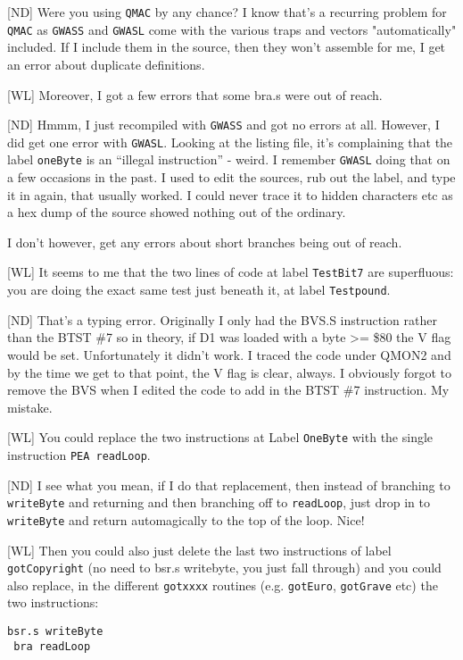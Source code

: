 [ND] Were you using \texttt{QMAC} by any chance? I know that's a recurring problem for \texttt{QMAC} as \texttt{GWASS} and \texttt{GWASL} come with the various traps and vectors "automatically" included. If I include them in the source, then they won't assemble for me, I get an error about duplicate definitions.


[WL] Moreover, I got a few errors that some bra.s  were out of reach.

[ND] Hmmm, I just recompiled with \texttt{GWASS} and got no errors at all. However, I did get one error with \texttt{GWASL}. Looking at the listing file, it's complaining that the label \texttt{oneByte} is an ``illegal instruction'' - weird. I remember \texttt{GWASL} doing that on a few occasions in the past. I used to edit the sources, rub out the label, and type it in again, that usually worked. I could never trace it to hidden characters etc as a hex dump of the source showed nothing out of the ordinary.

I don't however, get any errors about short branches being out of reach. 


[WL] It seems to me that the two lines of code at label \texttt{TestBit7} are superfluous: you are doing the exact same test just beneath it, at label \texttt{Testpound}.

[ND] That's a typing error. Originally I only had the BVS.S instruction rather than the BTST \#7 so in theory, if D1 was loaded with a byte >= \$80 the V flag would be set. Unfortunately it didn't work. I traced the code under QMON2 and by the time we get to that point, the V flag is clear, always. I obviously forgot to remove the BVS when I edited the code to add in the BTST \#7 instruction. My mistake.


[WL] You could replace the two instructions at Label \texttt{OneByte} with the single instruction \texttt{PEA readLoop}.

[ND] I see what you mean, if I do that replacement, then instead of branching to \texttt{writeByte} and returning and then branching off to \texttt{readLoop}, just drop in to \texttt{writeByte} and return automagically to the top of the loop. Nice!


[WL] Then you could also just delete the last two instructions of label \texttt{gotCopyright} (no need to bsr.s writebyte, you just fall through) and you could also replace, in the different \texttt{gotxxxx} routines (e.g. \texttt{gotEuro}, \texttt{gotGrave} etc) the two instructions:

\begin{lstlisting}[numbers=none]
 bsr.s writeByte
 bra readLoop
\end{lstlisting}
 
